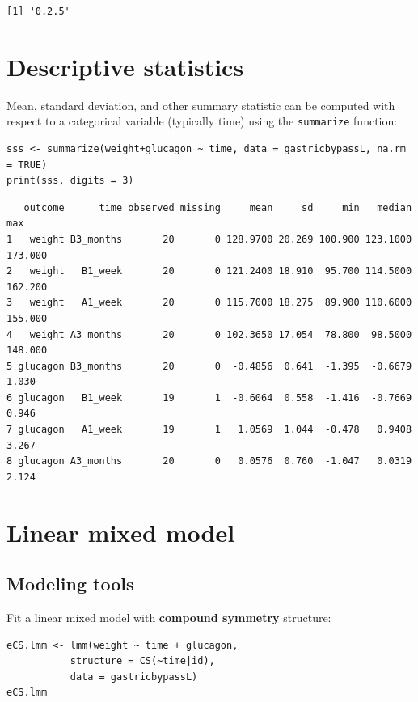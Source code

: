 \documentclass[12pt]{article}
\begin{document}
\begin{verbatim}
[1] '0.2.5'
\end{verbatim}


\clearpage

\section{Descriptive statistics}
\label{sec:org311696f}
Mean, standard deviation, and other summary statistic can be computed
with respect to a categorical variable (typically time) using the
\texttt{summarize} function:
\lstset{language=r,label= ,caption= ,captionpos=b,numbers=none}
\begin{lstlisting}
sss <- summarize(weight+glucagon ~ time, data = gastricbypassL, na.rm = TRUE)
print(sss, digits = 3)
\end{lstlisting}

\begin{verbatim}
   outcome      time observed missing     mean     sd     min   median     max
1   weight B3_months       20       0 128.9700 20.269 100.900 123.1000 173.000
2   weight   B1_week       20       0 121.2400 18.910  95.700 114.5000 162.200
3   weight   A1_week       20       0 115.7000 18.275  89.900 110.6000 155.000
4   weight A3_months       20       0 102.3650 17.054  78.800  98.5000 148.000
5 glucagon B3_months       20       0  -0.4856  0.641  -1.395  -0.6679   1.030
6 glucagon   B1_week       19       1  -0.6064  0.558  -1.416  -0.7669   0.946
7 glucagon   A1_week       19       1   1.0569  1.044  -0.478   0.9408   3.267
8 glucagon A3_months       20       0   0.0576  0.760  -1.047   0.0319   2.124
\end{verbatim}


\clearpage

\section{Linear mixed model}
\label{sec:orgeedf6c6}
\subsection{Modeling tools}
\label{sec:org43f3463}
Fit a linear mixed model with \textbf{compound symmetry} structure:
\lstset{language=r,label= ,caption= ,captionpos=b,numbers=none}
\begin{lstlisting}
eCS.lmm <- lmm(weight ~ time + glucagon,
	       structure = CS(~time|id),
	       data = gastricbypassL)
eCS.lmm
\end{lstlisting}
\end{document}
